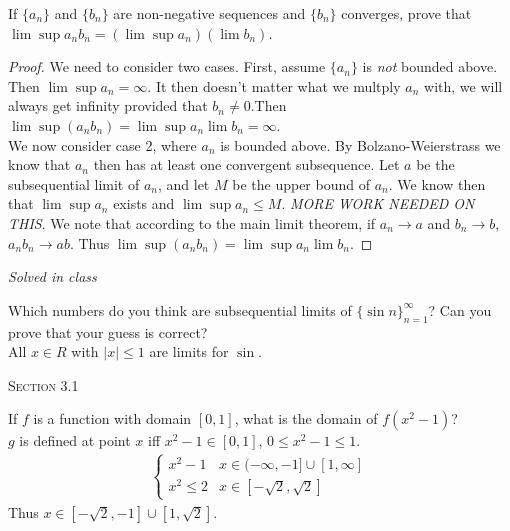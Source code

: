 \documentclass[12pt]{article}
\newenvironment{exercise}[2][Exercise]{\begin{trivlist}
\item[\hskip \labelsep {\bfseries #1}\hskip \labelsep {\bfseries #2.}]}{\end{trivlist}}
\begin{document}
\begin{exercise}{2.6.8}
If $\{a_n\}$ and $\{b_n\}$ are non-negative sequences and $\{b_n\}$ converges, prove that $\lim \sup a_n b_n= (\lim \sup a_n) (\lim b_n)$.

	\begin{proof}
	We need to consider two cases. First, assume $\{a_n\}$ is \emph{not} bounded above. Then $\lim \sup a_n  = \infty$. It then doesn't matter what we multply $a_n$ with, we will always get infinity provided that $b_n \neq 0$.Then $\lim \sup (a_n b_n) = \lim \sup a_n \lim b_n = \infty$. \\
	We now consider case 2, where $a_n$ is bounded above. By Bolzano-Weierstrass we know that $a_n$ then has at least one convergent subsequence. Let $a$ be the subsequential limit of $a_n$, and let $M$ be the upper bound of $a_n$. We know then that $\lim \sup a_n$ exists and $\lim \sup a_n \leq M$. \emph{MORE WORK NEEDED ON THIS}. We note that according to the main limit theorem, if $a_n \to a$ and $b_n \to b$, $a_n b_n \to a b$. Thus $\lim \sup (a_n b_n) = \lim \sup a_n \lim b_n$.
	\end{proof}
\end{exercise}


\begin{exercise}{2.6.9}
\emph{Solved in class}
\end{exercise}


\begin{exercise}{2.6.12}
Which numbers do you think are subsequential limits of $\{ \sin n\}_{n=1}^\infty$? Can you prove that your guess is correct? \\

All $x \in R$ with $|x| \leq 1$ are limits for $\sin$.
\end{exercise}




\begin{center}
\textsc{\Large Section 3.1}
\end{center}

\begin{exercise}{3.1.1}
    If $f$ is a function with domain $[0,1]$, what is the domain of $f(x^2 -1)$? \\
    
    $g$ is defined at point $x$ iff $x^2-1 \in [0,1]$, $0 \leq x^2-1 \leq 1$.
    \begin{align*}
        \begin{cases}
            x^2-1 & x\in (-\infty,-1] \cup [1,\infty] \\
            x^2 \leq 2 & x \in [-\sqrt{2},\sqrt{2}]
         \end{cases}
    \end{align*}
    Thus $x \in [-\sqrt{2},-1] \cup [1,\sqrt{2}]$.
\end{exercise}
\end{document}
